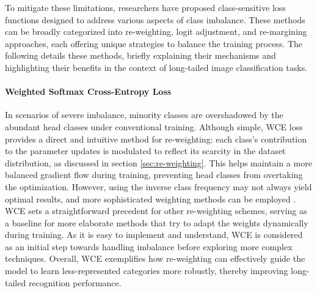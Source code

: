 To mitigate these limitations, researchers have proposed class-sensitive loss functions designed to address various aspects of class imbalance. These methods can be broadly categorized into re-weighting, logit adjustment, and re-margining approaches, each offering unique strategies to balance the training process. The following details these methods, briefly explaining their mechanisms and highlighting their benefits in the context of long-tailed image classification tasks.

\paragraph{Weighted Softmax Cross-Entropy Loss}
In scenarios of severe imbalance, minority classes are overshadowed by the abundant head classes under conventional training. Although simple, WCE loss \cite{zhang2023deep} provides a direct and intuitive method for re-weighting: each class's contribution to the parameter updates is modulated to reflect its scarcity in the dataset distribution, as discussed in section \ref{sec:re-weighting}. This helps maintain a more balanced gradient flow during training, preventing head classes from overtaking the optimization. However, using the inverse class frequency may not always yield optimal results, and more sophisticated weighting methods can be employed \cite{zhang2023deep}. WCE sets a straightforward precedent for other re-weighting schemes, serving as a baseline for more elaborate methods that try to adapt the weights dynamically during training. As it is easy to implement and understand, WCE is considered as an initial step towards handling imbalance before exploring more complex techniques. Overall, WCE exemplifies how re-weighting can effectively guide the model to learn less-represented categories more robustly, thereby improving long-tailed recognition performance.

